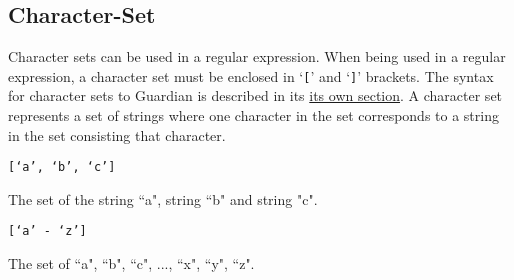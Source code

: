 
\subsection{Character-Set}
{
	Character sets can be used in a regular expression.
	When being used in a regular expression, a character set must be enclosed in
	`\texttt{[}' and `\texttt{]}' brackets.
	The syntax for character sets to Guardian is described in its
	\hyperref[sec:charset]{its own section}.
	A character set represents a set of strings where one character
	in the set corresponds to a string in the set consisting that character.
	
	\begin{itemize}
	{
		\item[] \texttt{[`a', `b', `c']}
		
			The set of the string ``a", string
			``b" and string "c".
		
		\item[] \texttt{[`a' - `z']}
		
			The set of ``a", ``b", ``c", ..., ``x", ``y", ``z".
	}
	\end{itemize}
	
}
